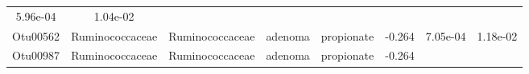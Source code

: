 \documentclass[11pt,]{article}
\begin{document}
\begin{longtable}[]{@{}cccccccc@{}}
\begin{minipage}[t]{0.08\columnwidth}
5.96e-04\strut
\end{minipage} & \begin{minipage}[t]{0.08\columnwidth}\centering\strut
1.04e-02\strut
\end{minipage}\tabularnewline
\begin{minipage}[t]{0.08\columnwidth}\centering\strut
Otu00562\strut
\end{minipage} & \begin{minipage}[t]{0.15\columnwidth}\centering\strut
Ruminococcaceae\strut
\end{minipage} & \begin{minipage}[t]{0.15\columnwidth}\centering\strut
Ruminococcaceae\strut
\end{minipage} & \begin{minipage}[t]{0.08\columnwidth}\centering\strut
adenoma\strut
\end{minipage} & \begin{minipage}[t]{0.09\columnwidth}\centering\strut
propionate\strut
\end{minipage} & \begin{minipage}[t]{0.07\columnwidth}\centering\strut
-0.264\strut
\end{minipage} & \begin{minipage}[t]{0.08\columnwidth}\centering\strut
7.05e-04\strut
\end{minipage} & \begin{minipage}[t]{0.08\columnwidth}\centering\strut
1.18e-02\strut
\end{minipage}\tabularnewline
\begin{minipage}[t]{0.08\columnwidth}\centering\strut
Otu00987\strut
\end{minipage} & \begin{minipage}[t]{0.15\columnwidth}\centering\strut
Ruminococcaceae\strut
\end{minipage} & \begin{minipage}[t]{0.15\columnwidth}\centering\strut
Ruminococcaceae\strut
\end{minipage} & \begin{minipage}[t]{0.08\columnwidth}\centering\strut
adenoma\strut
\end{minipage} & \begin{minipage}[t]{0.09\columnwidth}\centering\strut
propionate\strut
\end{minipage} & \begin{minipage}[t]{0.07\columnwidth}\centering\strut
-0.264\strut
\end{minipage} & \begin{minipage}[t]{0.08\columnwidth}\centering\strut

\end{minipage}
\end{longtable}
\end{document}
